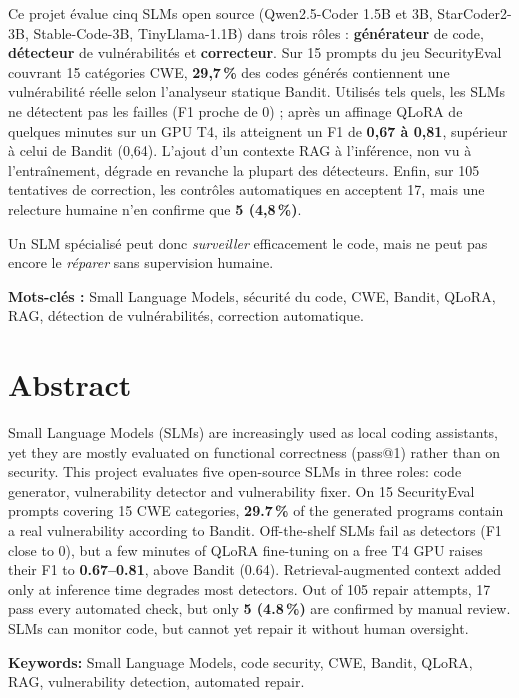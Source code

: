 \documentclass[11pt,a4paper,oneside]{report}
\begin{document}
Ce projet évalue cinq SLMs open source (Qwen2.5-Coder 1.5B et 3B, StarCoder2-3B, Stable-Code-3B, TinyLlama-1.1B) dans trois rôles : \textbf{générateur} de code, \textbf{détecteur} de vulnérabilités et \textbf{correcteur}. Sur 15 prompts du jeu SecurityEval couvrant 15 catégories CWE, \textbf{29,7\,\%} des codes générés contiennent une vulnérabilité réelle selon l'analyseur statique Bandit. Utilisés tels quels, les SLMs ne détectent pas les failles (F1 proche de 0) ; après un affinage QLoRA de quelques minutes sur un GPU T4, ils atteignent un F1 de \textbf{0,67 à 0,81}, supérieur à celui de Bandit (0,64). L'ajout d'un contexte RAG à l'inférence, non vu à l'entraînement, dégrade en revanche la plupart des détecteurs. Enfin, sur 105 tentatives de correction, les contrôles automatiques en acceptent 17, mais une relecture humaine n'en confirme que \textbf{5 (4,8\,\%)}.

Un SLM spécialisé peut donc \emph{surveiller} efficacement le code, mais ne peut pas encore le \emph{réparer} sans supervision humaine.

\vspace{0.5em}
\noindent\textbf{Mots-clés :} Small Language Models, sécurité du code, CWE, Bandit, QLoRA, RAG, détection de vulnérabilités, correction automatique.

\chapter*{Abstract}
Small Language Models (SLMs) are increasingly used as local coding assistants, yet they are mostly evaluated on functional correctness (pass@1) rather than on security. This project evaluates five open-source SLMs in three roles: code generator, vulnerability detector and vulnerability fixer. On 15 SecurityEval prompts covering 15 CWE categories, \textbf{29.7\,\%} of the generated programs contain a real vulnerability according to Bandit. Off-the-shelf SLMs fail as detectors (F1 close to 0), but a few minutes of QLoRA fine-tuning on a free T4 GPU raises their F1 to \textbf{0.67--0.81}, above Bandit (0.64). Retrieval-augmented context added only at inference time degrades most detectors. Out of 105 repair attempts, 17 pass every automated check, but only \textbf{5 (4.8\,\%)} are confirmed by manual review. SLMs can monitor code, but cannot yet repair it without human oversight.

\vspace{0.5em}
\noindent\textbf{Keywords:} Small Language Models, code security, CWE, Bandit, QLoRA, RAG, vulnerability detection, automated repair.
\end{document}
